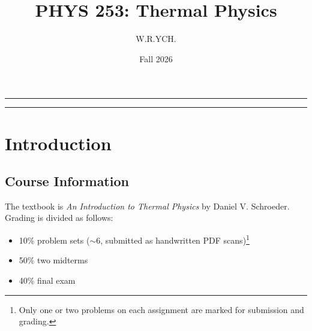 \documentclass{article}
\begin{document}
\title{PHYS 253: Thermal Physics}
\author{W.R.YCH.}
\date{Fall 2026}
\setcounter{Maxaffil}{0}
\renewcommand\Affilfont{\itshape\small}
\maketitle

\noindent\rule{\textwidth}{0.4pt}
\thispagestyle{empty}
\begin{abstract}
\end{abstract}
\noindent\rule{\textwidth}{0.4pt}
\clearpage

\pagestyle{empty}
{
  \hypersetup{linkcolor=black}
  \tableofcontents
}
\clearpage
\pagestyle{plain}

\setcounter{page}{1}

\section{Introduction}

\subsection{Course Information}
The textbook is \textit{An Introduction to Thermal Physics} by Daniel V. Schroeder. Grading is divided as follows:
\begin{itemize}
    \item 10\% problem sets ($\sim 6$, submitted as handwritten PDF scans)\footnote{Only one or two problems on each assignment are marked for submission and grading.}
    \item 50\% two midterms
    \item 40\% final exam
\end{itemize}

\end{document}
